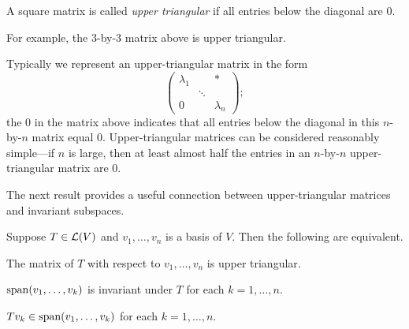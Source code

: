 \begin{definition}\label{ax:5.38}
A square matrix is called \emph{upper triangular} if all entries below the
diagonal are $0$.
\end{definition}

For example, the $3$-by-$3$ matrix above is upper triangular.

Typically we represent an upper-triangular matrix in the form
\[ \begin{pmatrix} \lambda_1 & & *\\ & \ddots & \\ 0 & & \lambda_n
   \end{pmatrix}; \]
%
the $0$ in the matrix above indicates that all entries below the diagonal in this
$n$-by-$n$ matrix equal $0$. Upper-triangular matrices can be considered
reasonably simple---if $n$ is large, then at least almost half the entries in an
$n$-by-$n$ upper-triangular matrix are $0$.

The next result provides a useful connection between upper-triangular matrices
and invariant subspaces.

\begin{result}\label{ax:5.39}
Suppose $T\in\mathcal{L}(V)$ and $v_1,\dots,v_n$ is a basis of $V$. Then the following
are equivalent.
\begin{parts}
\item The matrix of $T$ with respect to $v_1,\dots,v_n$ is upper triangular.
\item $\operatorname{span}(v_1,\dots,v_k)$ is invariant under $T$ for each $k=1,\dots,n$.
\item $Tv_k\in\operatorname{span}(v_1,\dots,v_k)$ for each $k=1,\dots,n$.
\end{parts}
\end{result}

